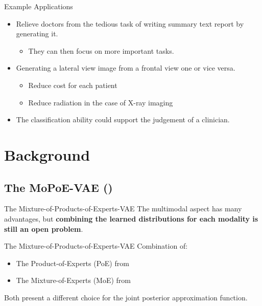     \begin{frame}{Example Applications}
    \begin{itemize}
        \pause
        \item Relieve doctors from the tedious task of writing summary text report by generating it.
        \pause
        \begin{itemize}
            \item They can then focus on more important tasks.
        \end{itemize}
        \pause
        \item Generating a lateral view image from a frontal view one or vice versa.
        \pause
        \begin{itemize}
            \item Reduce cost for each patient
            \item Reduce radiation in the case of X-ray imaging
        \end{itemize}
        \pause
        \item The classification ability could support the judgement of a clinician.
    \end{itemize}
        
    \end{frame}
    
    \section{Background}

    \subsection{The MoPoE-VAE (\cite{thomas_gener-ELBO})}
    \begin{frame}{The Mixture-of-Products-of-Experts-VAE}
        The multimodal aspect has many advantages, but \textbf{combining the learned distributions for each modality is still an open problem}.
    \end{frame}
    
    \begin{frame}{The Mixture-of-Products-of-Experts-VAE}
        Combination of:
        \begin{itemize}
            \item The Product-of-Experts (PoE) from \cite{wu2018multimodal}
            \item The Mixture-of-Experts (MoE) from \cite{shi2019variational}
        \end{itemize}
        \vspace{\baselineskip}
        Both present a different choice for the joint posterior approximation function.
    \end{frame}
    

